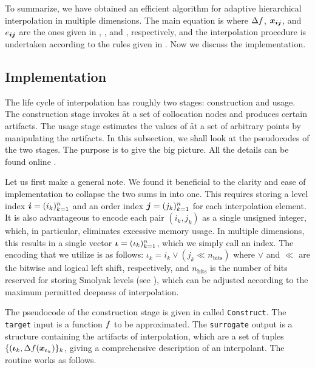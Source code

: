 To summarize, we have obtained an efficient algorithm for adaptive hierarchical
interpolation in multiple dimensions. The main equation is 
where $\Delta f$, $\boldsymbol{x}_{\boldsymbol{i} \boldsymbol{j}}$, and $e_{\boldsymbol{i} \boldsymbol{j}}$ are the ones given in
, , and , respectively, and the
interpolation procedure is undertaken according to the rules given in
. Now we discuss the implementation.

\subsection{Implementation}

The life cycle of interpolation has roughly two stages: construction and usage.
The construction stage invokes \f at a set of collocation nodes and produces
certain artifacts. The usage stage estimates the values of \f at a set of
arbitrary points by manipulating the artifacts. In this subsection, we shall
look at the pseudocodes of the two stages. The purpose is to give the big
picture. All the details can be found online \cite{sources}.

Let us first make a general note. We found it beneficial to the clarity and ease
of implementation to collapse the two sums in  into one.
This requires storing a level index $\boldsymbol{i} = (i_k)_{k = 1}^n$ and an order index
$\boldsymbol{j} = (j_k)_{k = 1}^n$ for each interpolation element. It is also advantageous
to encode each pair $(i_k, j_k)$ as a single unsigned integer, which, in
particular, eliminates excessive memory usage. In multiple dimensions, this
results in a single vector $\boldsymbol{\iota} = (\iota_k)_{k = 1}^n$, which we simply
call an index. The encoding that we utilize is as follows: $\iota_k = i_k \lor
(j_k \ll n_\text{bits})$ where $\lor$ and $\ll$ are the bitwise  and
logical left shift, respectively, and $n_\text{bits}$ is the number of bits
reserved for storing Smolyak levels (see ), which can be
adjusted according to the maximum permitted deepness of interpolation.

The pseudocode of the construction stage is given in  called
\texttt{Construct}. The \texttt{target} input is a function $f$ to be
approximated. The \texttt{surrogate} output is a structure containing the
artifacts of interpolation, which are a set of tuples $\{ (\boldsymbol{\iota}_k,
\Delta f(\boldsymbol{x}_{\boldsymbol{\iota}_k}) \}_k$, giving a comprehensive description of an
interpolant. The routine works as follows.

